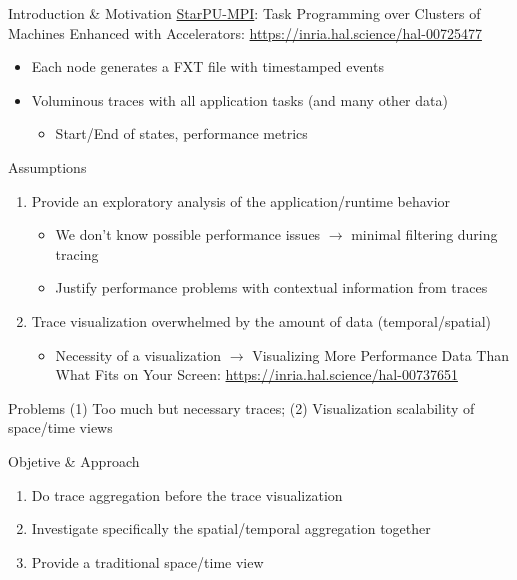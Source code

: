 \documentclass[12pt,xcolor=dvipsnames,presentation,aspectratio=169]{beamer}
\begin{document}
{\maketitle
\begin{frame}[label={sec:org806b622}]{Introduction \& Motivation}
\uline{StarPU-MPI}: Task Programming over Clusters of Machines Enhanced with Accelerators:
\url{https://inria.hal.science/hal-00725477}
\begin{itemize}
\item Each node generates a FXT file with timestamped events
\item Voluminous traces with all application tasks (and many other data)
\begin{itemize}
\item Start/End of states, performance metrics
\end{itemize}
\end{itemize}

\vfill\pause

Assumptions
\begin{enumerate}
\item Provide an exploratory analysis of the application/runtime behavior
\begin{itemize}
\item We don't know possible performance issues \(\to\) minimal filtering
during tracing
\item Justify performance problems with contextual information from traces
\end{itemize}
\item Trace visualization overwhelmed by the amount of data (temporal/spatial)
\begin{itemize}
\item Necessity of a visualization \(\to\) Visualizing More Performance Data
Than What Fits on Your Screen: \url{https://inria.hal.science/hal-00737651}
\end{itemize}
\end{enumerate}

\vfill\pause
\begin{block}{Problems}
(1) Too much but necessary traces; (2) Visualization scalability of space/time views
\end{block}
\end{frame}
\begin{frame}[label={sec:org13ef2c3},fragile]{Objetive \& Approach}
 \begin{enumerate}
\item Do trace aggregation before the trace visualization
\item Investigate specifically the spatial/temporal aggregation together
\item Provide a traditional space/time view
\end{enumerate}


\end{frame}}
\end{document}
